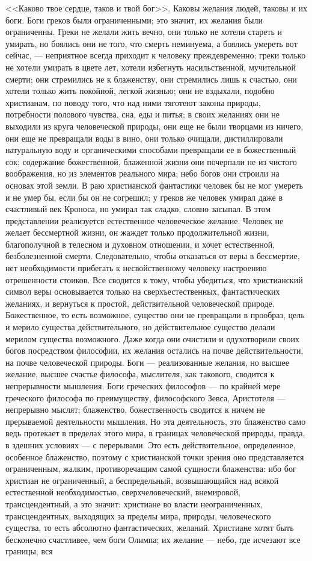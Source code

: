 \documentclass[12pt,oneside]{book}
\begin{document}
<<Каково твое сердце, таков и твой бог>>. Каковы желания людей, таковы и их боги. Боги греков были ограниченными; это значит, их желания были ограниченны. Греки не желали жить вечно, они только не хотели стареть и умирать, но боялись они не того, что смерть неминуема, а боялись умереть вот сейчас, --- неприятное всегда приходит к человеку преждевременно; греки только не хотели умирать в цвете лет, хотели избегнуть насильственной, мучительной смерти; они стремились не к блаженству, они стремились лишь к счастью, они хотели только жить покойной, легкой жизнью; они не вздыхали, подобно христианам, по поводу того, что над ними тяготеют законы природы, потребности полового чувства, сна, еды и питья; в своих желаниях они не выходили из круга человеческой природы, они еще не были творцами из ничего, они еще не превращали воды в вино, они только очищали, дистиллировали натуральную воду и органическими способами превращали ее в божественный сок; содержание божественной, блаженной жизни они почерпали не из чистого воображения, но из элементов реального мира; небо богов они строили на основах этой земли. В раю христианской фантастики человек бы не мог умереть и не умер бы, если бы он не согрешил; у греков же человек умирал даже в счастливый век Кроноса, но умирал так сладко, словно засыпал. В этом представлении реализуется естественное человеческое желание. Человек не желает бессмертной жизни, он жаждет только продолжительной жизни, благополучной в телесном и духовном отношении, и хочет естественной, безболезненной смерти. Следовательно, чтобы отказаться от веры в бессмертие, нет необходимости прибегать к несвойственному человеку настроению отрешенности стоиков. Все сводится к тому, чтобы убедиться, что христианский символ веры основывается только на сверхъестественных, фантастических желаниях, и вернуться к простой, действительной человеческой природе. Божественное, то есть возможное, существо они не превращали в прообраз, цель и мерило существа действительного, но действительное существо делали мерилом существа возможного. Даже когда они очистили и одухотворили своих богов посредством философии, их желания остались на почве действительности, на почве человеческой природы. Боги --- реализованные желания, но высшее желание, высшее счастье философа, мыслителя, как такового, сводится к непрерывности мышления. Боги греческих философов --- по крайней мере греческого философа по преимуществу, философского Зевса, Аристотеля --- непрерывно мыслят; блаженство, божественность сводится к ничем не прерываемой деятельности мышления. Но эта деятельность, это блаженство само ведь протекает в пределах этого мира, в границах человеческой природы, правда, в здешних условиях --- с перерывами. Это есть действительное, определенное, особенное блаженство, поэтому с христианской точки зрения оно представляется ограниченным, жалким, противоречащим самой сущности блаженства: ибо бог христиан не ограниченный, а беспредельный, возвышающийся над всякой естественной необходимостью, сверхчеловеческий, внемировой, трансцендентный, а это значит: христиане во власти неограниченных, трансцендентных, выходящих за пределы мира, природы, человеческого существа, то есть абсолютно фантастических, желаний. Христиане хотят быть бесконечно счастливее, чем боги Олимпа; их желание --- небо, где исчезают все границы, вся 
\end{document}
